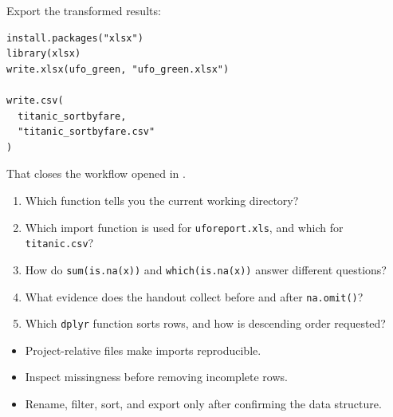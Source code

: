 Export the transformed results:

\begin{lstlisting}[style=dsr]
install.packages("xlsx")
library(xlsx)
write.xlsx(ufo_green, "ufo_green.xlsx")

write.csv(
  titanic_sortbyfare,
  "titanic_sortbyfare.csv"
)
\end{lstlisting}

That closes the workflow opened in .

\begin{quickcheck}
\begin{enumerate}
  \item Which function tells you the current working directory?
  \item Which import function is used for \texttt{uforeport.xls}, and which for \texttt{titanic.csv}?
  \item How do \texttt{sum(is.na(x))} and \texttt{which(is.na(x))} answer different questions?
  \item What evidence does the handout collect before and after \texttt{na.omit()}?
  \item Which \texttt{dplyr} function sorts rows, and how is descending order requested?
\end{enumerate}
\end{quickcheck}

\begin{chapterrecap}
\begin{itemize}
  \item Project-relative files make imports reproducible.
  \item Inspect missingness before removing incomplete rows.
  \item Rename, filter, sort, and export only after confirming the data structure.
\end{itemize}
\end{chapterrecap}
